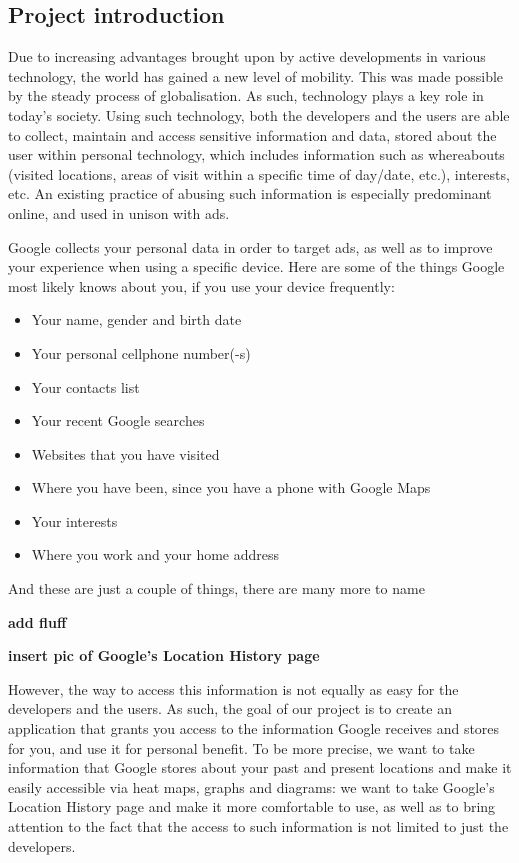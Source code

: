 \documentclass[12p]{article}
\begin{document}
		\subsection{Project introduction} \label{ProjectIntroduction}
		
		Due to increasing advantages brought upon by active developments in various technology, the world has gained a new level of mobility. This was made possible by the steady process of globalisation. As such, technology plays a key role in today's society. Using such technology, both the developers and the users are able to collect, maintain and access sensitive information and data, stored about the user within personal technology, which includes information such as whereabouts (visited locations, areas of visit within a specific time of day/date, etc.), interests, etc. An existing practice of abusing such information is especially predominant online, and used in unison with ads.
		
		Google collects your personal data in order to target ads, as well as to improve your experience when using a specific device. Here are some of the things Google most likely knows about you, if you use your device frequently:
		\begin{itemize}
			\item Your name, gender and birth date
			\item Your personal cellphone number(-s)
			\item Your contacts list
			\item Your recent Google searches
			\item Websites that you have visited
			\item Where you have been, since you have a phone with Google Maps
			\item Your interests
			\item Where you work and your home address
		\end{itemize}
		
		And these are just a couple of things, there are many more to name
		
		\textbf{add fluff}
		
		\textbf{insert pic of Google’s Location History page}
		
		However, the way to access this information is not equally as easy for the developers and the users. As such, the goal of our project is to create an application that grants you access to the information Google receives and stores for you, and use it for personal benefit. To be more precise, we want to take information that Google stores about your past and present locations and make it easily accessible via heat maps, graphs and diagrams: we want to take Google's Location History page and make it more comfortable to use, as well as to bring attention to the fact that the access to such information is not limited to just the developers.
		
\end{document}
